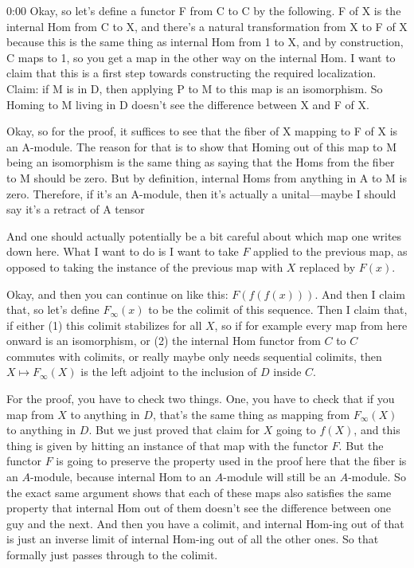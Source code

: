 \begin{unfinished}{0:00}
Okay, so let's define a functor F from C to C by the following. F of X is the internal Hom from C to X, and there's a natural transformation from X to F of X because this is the same thing as internal Hom from 1 to X, and by construction, C maps to 1, so you get a map in the other way on the internal Hom. I want to claim that this is a first step towards constructing the required localization. Claim: if M is in D, then applying P to M to this map is an isomorphism. So Homing to M living in D doesn't see the difference between X and F of X.

Okay, so for the proof, it suffices to see that the fiber of X mapping to F of X is an A-module. The reason for that is to show that Homing out of this map to M being an isomorphism is the same thing as saying that the Homs from the fiber to M should be zero. But by definition, internal Homs from anything in A to M is zero. Therefore, if it's an A-module, then it's actually a unital---maybe I should say it's a retract of A tensor

And one should actually potentially be a bit careful about which map one writes down here. What I want to do is I want to take $F$ applied to the previous map, as opposed to taking the instance of the previous map with $X$ replaced by $F(x)$.

Okay, and then you can continue on like this: $F(f(f(x)))$. And then I claim that, so let's define $F_\infty(x)$ to be the colimit of this sequence. Then I claim that, if either (1) this colimit stabilizes for all $X$, so if for example every map from here onward is an isomorphism, or (2) the internal $\text{Hom}$ functor from $C$ to $C$ commutes with colimits, or really maybe only needs sequential colimits, then $X \mapsto F_\infty(X)$ is the left adjoint to the inclusion of $D$ inside $C$.

For the proof, you have to check two things. One, you have to check that if you map from $X$ to anything in $D$, that's the same thing as mapping from $F_\infty(X)$ to anything in $D$. But we just proved that claim for $X$ going to $f(X)$, and this thing is given by hitting an instance of that map with the functor $F$. But the functor $F$ is going to preserve the property used in the proof here that the fiber is an $A$-module, because internal $\text{Hom}$ to an $A$-module will still be an $A$-module. So the exact same argument shows that each of these maps also satisfies the same property that internal $\text{Hom}$ out of them doesn't see the difference between one guy and the next. And then you have a colimit, and internal $\text{Hom}$-ing out of that is just an inverse limit of internal $\text{Hom}$-ing out of all the other ones. So that formally just passes through to the colimit.


\end{unfinished}
